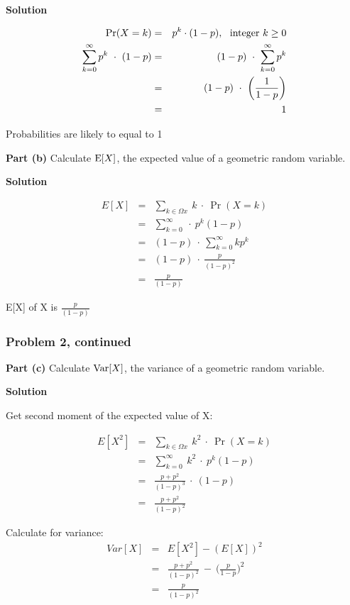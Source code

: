 \documentclass[12pt]{article}
\theoremstyle{definition}
\begin{document}
\bigskip
\noindent
{\bf Solution}

\begin{eqnarray*}
\Pr(X = k) & = & p^k \cdot (1-p),\ \ \hbox{integer } k \geq 0 \\
\sum_{k=0}^\infty p^k \ \cdot \ (1-p) & = & (1-p) \ \cdot \ \sum_{k=0}^\infty p^k \\
& = & (1-p) \ \cdot \ \bigg( \frac{1}{1-p} \bigg) \\
& = & 1 \\
\end{eqnarray*}

Probabilities are likely to equal to 1

\vspace{1.0in}
\noindent
{\bf Part (b)} Calculate $\hbox{E}[X]$, the expected value of a geometric random variable.

\bigskip
\noindent
{\bf Solution}

\begin{eqnarray*}
E[X] & = &  \sum_{k\in\Omega x} \ k \ \cdot \ \Pr(X=k)\\
& = & \sum_{k=0}^\infty \ \cdot \ p^k (1-p) \\
& = & (1-p) \ \cdot \ \sum_{k=0}^\infty kp^k\\
& = & (1-p) \ \cdot \ \frac{p}{(1-p)^2}\\
& = & \frac{p}{(1-p)}
\end{eqnarray*}

E[X] of X is $\frac{p}{(1-p)}$

\newpage
\subsubsection*{Problem 2, continued}

\noindent
{\bf Part (c)} Calculate $\hbox{Var}[X]$, the variance of a geometric random variable.

\bigskip
\noindent
{\bf Solution}

Get second moment of the expected value of X:

\begin{eqnarray*}
E[X^2] & = &  \sum_{k\in\Omega x} \ k^2 \ \cdot \ \Pr(X=k)\\
& = & \sum_{k=0}^\infty \ k^2 \ \cdot \ p^k (1-p) \\
& = & \frac{p+p^2}{(1-p)^3} \ \cdot \ (1-p) \\
& = & \frac{p+p^2}{(1-p)^2}
\end{eqnarray*}

Calculate for variance:
\begin{eqnarray*}
Var[X] & = & E[X^2] - (E[X])^2 \\
& = & \frac{p+p^2}{(1-p)^2} \ - \ \bigg( \frac{p}{1-p} \bigg)^2 \\
& = & \frac{p}{(1-p)^2}\\
\end{eqnarray*}
\end{document}
